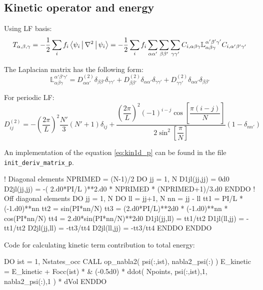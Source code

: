 \subsection{Kinetic operator and energy}

Using LF basis:
\begin{equation}
T_{\alpha,\beta,\gamma} = -\frac{1}{2} \sum_{i} f_{i}
\Braket{ \psi_{i} | \nabla^2 | \psi_{i} } =
-\frac{1}{2}
\sum_{i} f_{i} \sum_{\alpha\alpha'} \sum_{\beta\beta'} \sum_{\gamma\gamma'}
C_{i,\alpha\beta\gamma} \mathbb{L}_{\alpha\beta\gamma}^{\alpha'\beta'\gamma'}
C_{i,\alpha'\beta'\gamma'}
\end{equation}

The Laplacian matrix has the following form:
\begin{equation}
\mathbb{L}_{\alpha\beta\gamma}^{\alpha'\beta'\gamma'} =
D^{(2)}_{\alpha\alpha'}\delta_{\beta\beta'}\delta_{\gamma\gamma'} +
D^{(2)}_{\beta\beta'}\delta_{\alpha\alpha'}\delta_{\gamma\gamma'} +
D^{(2)}_{\gamma\gamma'}\delta_{\alpha\alpha'}\delta_{\beta\beta'}
\end{equation}

For periodic LF:
\begin{equation}
D^{(2)}_{ij} = -\left( \frac{2\pi}{L} \right)^2 \frac{N'}{3} \left( N' + 1 \right) \delta_{ij} +
\dfrac{ \left(\dfrac{2\pi}{L}\right)^2 (-1)^{i-j}\cos\left[\dfrac{\pi(i-j)}{N}\right]}
{2\sin^2\left[\dfrac{\pi}{N}\right]}
(1-\delta_{nn'})
\label{eq:kin1d_p}
\end{equation}

An implementation of the equation \eqref{eq:kin1d_p} can be found in the file
{\tt init\_deriv\_matrix\_p}.
\begin{fortrancode}
! Diagonal elements
NPRIMED = (N-1)/2
DO jj = 1, N
  D1jl(jj,jj) = 0d0
  D2jl(jj,jj) = -( 2.d0*PI/L )**2.d0 * NPRIMED * (NPRIMED+1)/3.d0
ENDDO
! Off diagonal elements
DO jj = 1, N
  DO ll = jj+1, N
    nn = jj - ll
    tt1 = PI/L * (-1.d0)**nn
    tt2 = sin(PI*nn/N)
    tt3 = (2.d0*PI/L)**2d0 * (-1.d0)**nn * cos(PI*nn/N)
    tt4 = 2.d0*sin(PI*nn/N)**2d0
    D1jl(jj,ll) =  tt1/tt2
    D1jl(ll,jj) = -tt1/tt2
    D2jl(jj,ll) = -tt3/tt4
    D2jl(ll,jj) = -tt3/tt4
  ENDDO
ENDDO
\end{fortrancode}

Code for calculating kinetic term contribution to total energy:
\begin{fortrancode}
DO ist = 1, Nstates_occ
  CALL op_nabla2( psi(:,ist), nabla2_psi(:) )
  E_kinetic = E_kinetic + Focc(ist) * &
              (-0.5d0) * ddot( Npoints, psi(:,ist),1, nabla2_psi(:),1 ) * dVol
ENDDO
\end{fortrancode}

